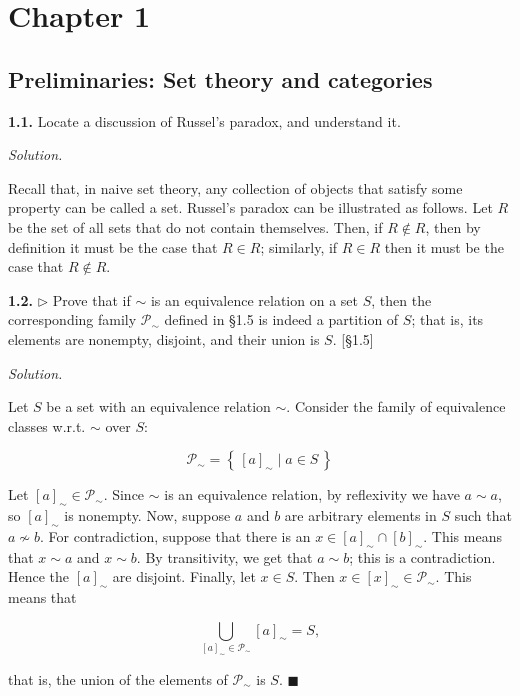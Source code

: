 \documentclass[14pt,parskip=full]{scrartcl}
\newcommand{\exercise}[3]{
\noindent
\textbf{#1.} #2

\noindent
\textit{Solution.}{\let\tpar\par \let\par\relax #3}
}
\newcommand{\set}[1]{\left\{\,#1\,\right\}}
\newcommand*{\QEDA}{\hfill\ensuremath{\blacksquare}}
\begin{document}

\section{Chapter 1}
\subsection{Preliminaries: Set theory and categories}

\exercise
{1.1}{Locate a discussion of Russel's paradox, and understand it.}{

Recall that, in naive set theory, any collection of objects that satisfy some
property can be called a set. Russel's paradox can be illustrated as follows.
Let $R$ be the set of all sets that do not contain themselves. Then, if $R\notin
R$, then by definition it must be the case that $R\in R$; similarly, if $R\in R$
then it must be the case that $R\notin R$.

}

\exercise
{1.2}{$\rhd$ Prove that if $\sim$ is an equivalence relation on a set $S$, then
the corresponding family $\mathscr{P}_{\sim}$ defined in \S1.5 is indeed a
partition of $S$; that is, its elements are nonempty, disjoint, and their union
is $S$.  [\S1.5]}{

Let $S$ be a set with an equivalence relation $\sim$. Consider the family of
equivalence classes w.r.t. $\sim$ over $S$:


\[ \mathscr{P}_{\sim} = \set{[a]_{\sim} \mid a\in S} \]

Let $[a]_{\sim}\in\mathscr{P}_{\sim}$. Since $\sim$ is an equivalence relation,
by reflexivity we have $a\sim a$, so $[a]_{\sim}$ is nonempty. Now, suppose
$a$ and $b$ are arbitrary elements in $S$ such that $a\not\sim b$. For
contradiction, suppose that there is an $x\in [a]_{\sim}\cap[b]_{\sim}$. This
means that $x\sim a$ and $x\sim b$. By transitivity, we get that $a\sim b$; this
is a contradiction. Hence the $[a]_{\sim}$ are disjoint. Finally, let $x\in S$.
Then $x\in[x]_{\sim}\in \mathscr{P}_{\sim}$. This means that

\[ \bigcup_{[a]_{\sim} \in \mathscr{P}_{\sim}} [a]_{\sim} = S, \]

that is, the union of the elements of $\mathscr{P}_{\sim}$ is $S$. \QEDA

}
\end{document}

